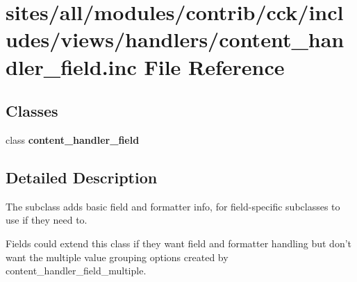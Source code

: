\hypertarget{content__handler__field_8inc}{
\section{sites/all/modules/contrib/cck/includes/views/handlers/content\_\-handler\_\-field.inc File Reference}
\label{content__handler__field_8inc}
}
\subsection*{Classes}
\begin{CompactItemize}
\item 
class \textbf{content\_\-handler\_\-field}
\end{CompactItemize}


\subsection{Detailed Description}
The subclass adds basic field and formatter info, for field-specific subclasses to use if they need to.

Fields could extend this class if they want field and formatter handling but don't want the multiple value grouping options created by content\_\-handler\_\-field\_\-multiple. 